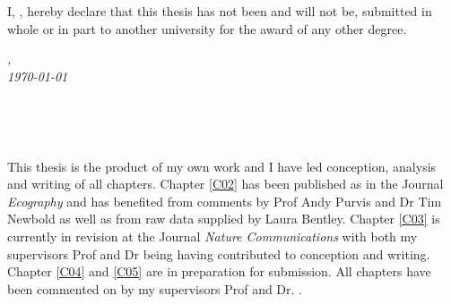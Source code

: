 %

\vspace*{5cm}

\begin{flushleft}
	\large{\noindent I, \myName, hereby declare that this thesis has not been and will not be, submitted in whole or in part to another university for the award of any other degree.}
\end{flushleft}

\vspace*{2cm}

\begin{minipage}{.45\linewidth}
	\begin{flushleft} %
		\textit{\myLocation,} \\
		\textit{\today}%
	\end{flushleft}
\end{minipage}
\hfill
\begin{minipage}{.45\linewidth}
	\begin{flushright} %
		\makebox[2.5in]{\hrulefill} \\
		\myName 
	\end{flushright}
\end{minipage}\\ [0.5cm]


\vspace*{4cm}

\begin{flushleft}
	\noindent This thesis is the product of my own work and I have led conception, analysis and writing of all chapters. Chapter \ref{C02} has been published as \cite{Jung2018} in the Journal \textit{Ecography} and has benefited from comments by Prof Andy Purvis and Dr Tim Newbold as well as from raw data supplied by Laura Bentley. Chapter \ref{C03} is currently in revision at the Journal \textit{Nature Communications} with both my supervisors Prof \myProf and Dr \myOtherProf being having contributed to conception and writing. Chapter \ref{C04} and \ref{C05} are in preparation for submission. All chapters have been commented on by my supervisors Prof \myProf and Dr. \myOtherProf.
\end{flushleft}

